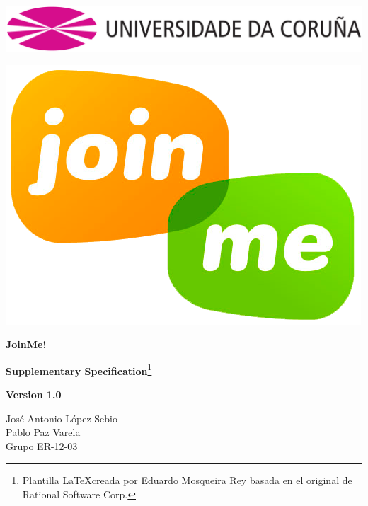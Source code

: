 \documentclass[12pt, a4paper, titlepage]{article}
\begin{document}

\begin{titlepage}

\includegraphics[width=15cm]{Imagenes/Simbolo_logo_UDC.png}

\vspace{3cm}

\begin{center}
	\includegraphics[scale=0.3]{Imagenes/1a_Practica_ER_14-15.png}
\end{center}

\begin{flushright}

	\LARGE{\textbf{JoinMe!}}
	
	\LARGE{\textbf{Supplementary Specification}}\footnote{Plantilla \LaTeX  creada por Eduardo Mosqueira Rey  basada en el original de Rational Software Corp.}
	
	\large{\textbf{Version 1.0}}
\end{flushright}
\vspace{1cm}
\begin{center}
	José Antonio López Sebio\\
	Pablo Paz Varela\\
	Grupo ER-12-03\\
\end{center}


\end{titlepage}
\end{document}
